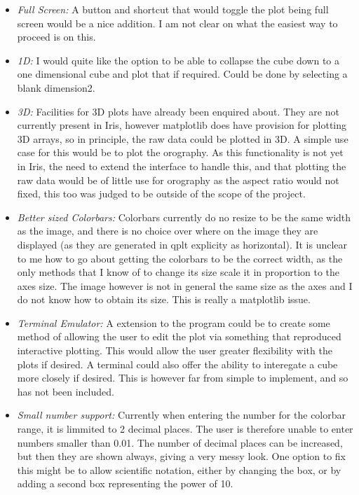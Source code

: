 \documentclass[whitecover]{MO_report}
\begin{document}
\begin{itemize}
\item
\emph{Full Screen:} A button and shortcut that would toggle the plot being
full screen would be a nice addition. I am not clear on what the easiest way
to proceed is on this. 

\item
\emph{1D:} I would quite like the option to be able to collapse the cube down
to a one dimensional cube and plot that if required. Could be done by selecting
a blank dimension2. 

\item
\emph{3D:} Facilities for 3D plots have already been enquired about. They are
not currently present in Iris, however matplotlib does have provision for
plotting 3D arrays, so in principle, the raw data could be plotted in 3D.
A simple use case for this would be to plot the orography.
As this functionality is not yet in Iris, the need to extend the interface
to handle this, and that plotting the raw data would be of little use for
orography as the aspect ratio would not fixed, this too was judged to be
outside of the scope of the project.

\item
\emph{Better sized Colorbars:} Colorbars currently do no resize to be the same
width as the image, and there is no choice over where on the image they are
displayed (as they are generated in qplt explicity as horizontal). It is unclear
to me how to go about getting the colorbars to be the correct width, as the
only methods that I know of to change its size scale it in proportion to the
axes size. The image however is not in general the same size as the axes and I
do not know how to obtain its size. This is really a matplotlib issue.

\item
\emph{Terminal Emulator:} A extension to the program could be to create
some method of allowing the user to edit the plot via something that reproduced
interactive plotting. This would allow the user greater flexibility with the
plots if desired. A terminal could also offer the ability to interegate a cube
more closely if desired. This is however far from simple to implement, and so
has not been included.

\item
\emph{Small number support:} Currently when entering the number for the colorbar
range, it is limmited to 2 decimal places. The user is therefore unable to
enter numbers smaller than 0.01. The number of decimal places can be increased,
but then they are shown always, giving a very messy look. One option to fix this
might be to allow scientific notation, either by changing the box, or by adding
a second box representing the power of 10.


\end{itemize}
\end{document}
